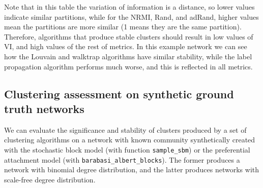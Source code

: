 Note that in this table the variation of information is a distance, so lower values indicate similar partitions, while for the NRMI, Rand, and adRand, higher values mean the partitions are more similar (1 means they are the same partition). 
Therefore, algorithms that produce stable clusters should result in low values of VI, and high values of the rest of metrics. In this example network we can see how the Louvain and walktrap algorithms have similar stability, while the label propagation algorithm performs much worse, and this is reflected in all metrics.



\subsection{Clustering assessment on synthetic ground truth networks}
We can evaluate the significance and stability of clusters produced by a set of clustering algorithms on a  network with known community synthetically created with the stochastic block model (with function {\tt sample\_sbm}) or the preferential attachment model (with {\tt barabasi\_albert\_blocks}). The former produces a network with binomial degree distribution, and the latter  produces networks with scale-free degree distribution.

